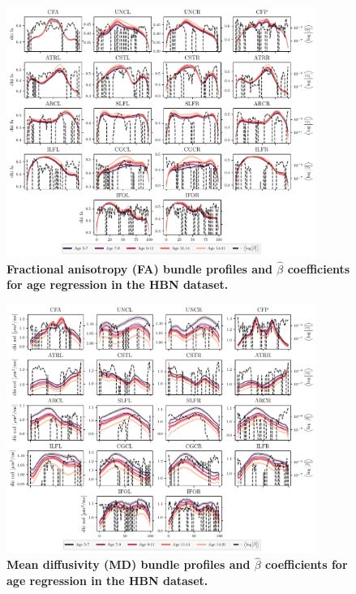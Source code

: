 \documentclass[10pt,letterpaper]{article}
\begin{document}
\begin{figure}
    \includegraphics[width=0.9\textwidth]{hbn_coefs_profiles_fa.pdf}
    \caption{%
        {%
            \bf Fractional anisotropy (FA) bundle profiles and $\hat{\beta}$
            coefficients for age regression in the HBN dataset.
        }
        \label{fig:hbn-bp:fa}
    }
\end{figure}

\begin{figure}
    \includegraphics[width=0.9\textwidth]{hbn_coefs_profiles_md.pdf}
    \caption{%
        {%
            \bf Mean diffusivity (MD) bundle profiles and $\hat{\beta}$
            coefficients for age regression in the HBN dataset.
        }
        \label{fig:hbn-bp:md}
    }
\end{figure}
\end{document}
